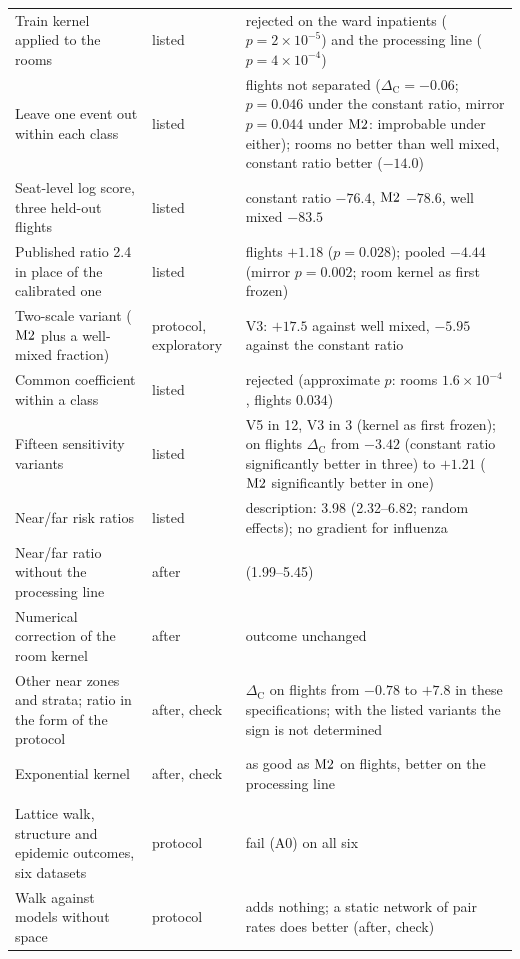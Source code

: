 {\begin{longtable}{@{}>{\raggedright}p{4.6cm}>{\raggedright}p{1.5cm}>{\raggedright\arraybackslash}p{9.4cm}@{}}
Train kernel applied to the rooms & listed & rejected on the ward inpatients ($p=2\times10^{-5}$) and the processing line ($p=4\times10^{-4}$) \\
Leave one event out within each class & listed & flights not separated ($\Delta_{\mathrm{C}}=-0.06$; $p=0.046$ under the constant ratio, mirror $p=0.044$ under $\mathrm{M2}$: improbable under either); rooms no better than well mixed, constant ratio better ($-14.0$) \\
Seat-level log score, three held-out flights & listed & constant ratio $-76.4$, $\mathrm{M2}$ $-78.6$, well mixed $-83.5$ \\
Published ratio 2.4 in place of the calibrated one & listed & flights $+1.18$ ($p=0.028$); pooled $-4.44$ (mirror $p=0.002$; room kernel as first frozen) \\
Two-scale variant ($\mathrm{M2}$ plus a well-mixed fraction) & protocol, exploratory & V3: $+17.5$ against well mixed, $-5.95$ against the constant ratio \\
Common coefficient within a class & listed & rejected (approximate $p$: rooms $1.6\times10^{-4}$, flights $0.034$) \\
Fifteen sensitivity variants & listed & V5 in 12, V3 in 3 (kernel as first frozen); on flights $\Delta_{\mathrm{C}}$ from $-3.42$ (constant ratio significantly better in three) to $+1.21$ ($\mathrm{M2}$ significantly better in one) \\
Near/far risk ratios & listed & description: 3.98 (2.32--6.82; random effects); no gradient for influenza \\
Near/far ratio without the processing line & after & 3.30 (1.99--5.45) \\
Numerical correction of the room kernel & after & outcome unchanged \\
Other near zones and strata; ratio in the form of the protocol & after, check & $\Delta_{\mathrm{C}}$ on flights from $-0.78$ to $+7.8$ in these specifications; with the listed variants the sign is not determined \\
Exponential kernel & after, check & as good as $\mathrm{M2}$ on flights, better on the processing line \\
\addlinespace
\multicolumn{3}{@{}l}{\emph{Contact records (Section~\ref{M-s8b_evidence:sec:contacts})}} \\
Lattice walk, structure and epidemic outcomes, six datasets & protocol & fail (A0) on all six \\
Walk against models without space & protocol & adds nothing; a static network of pair rates does better (after, check) \\

\end{longtable}}
